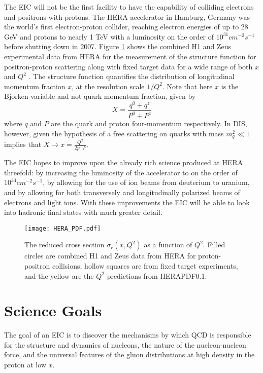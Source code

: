 The EIC will not be the first facility to have the capability of colliding electrons and positrons with protons. The HERA accelerator in Hamburg, Germany was the world's first electron-proton collider, reaching electron energies of up to 28 GeV and protons to nearly 1 TeV with a luminosity on the order of $10^{31}\unit{cm}^{-2}\unit{s}^{-1}$ before shutting down in 2007. Figure \ref{fig:HERA_pdf} shows the combined H1 and Zeus experimental data from HERA for the measurement of the structure function for positron-proton scattering along with fixed target data for a wide range of both $x$ and $Q^2$ \cite{HERAStructureFunction}. The structure function quantifies the distribution of longitudinal momentum fraction $x$, at the resolution scale $1/Q^2$. Note that here $x$ is the Bjorken variable and not quark momentum fraction, given by
%
\begin{equation}
X = \frac{q^0 + q^z}{P^0 + P^z}
\end{equation}
%
where $q$ and $P$ are the quark and proton four-momentum respectively. In DIS, however, given the hypothesis of a free scattering on quarks with mass $m_q^2 \ll 1$ implies that $X \rightarrow x = \frac{Q^2}{2p\cdot P}$.

The EIC hopes to improve upon the already rich science produced at HERA threefold: by increasing the luminosity of the accelerator to on the order of $10^{34}\unit{cm}^{-2}\unit{s}^{-1}$, by allowing for the use of ion beams from deuterium to uranium, and by allowing for both transversely and longitudinally polarized beams of electrons and light ions. With these improvements the EIC will be able to look into hadronic final states with much greater detail.

\begin{figure}[!htb]
	\centering
	\texttt{[image: HERA\_PDF.pdf]}
	\caption{The reduced cross section $\sigma_{r}(x,Q^2)$ as a function of $Q^2$. Filled circles are combined H1 and Zeus data from HERA for proton-positron collisions, hollow squares are from fixed target experiments, and the yellow are the $Q^2$ predictions from HERAPDF0.1.}
	\label{fig:HERA_pdf}
\end{figure}

\section{Science Goals}
The goal of an EIC is to discover the mechanisms by which QCD is responsible for the structure and dynamics of nucleons, the nature of the nucleon-nucleon force, and the universal features of the gluon distributions at high density in the proton at low $x$.

